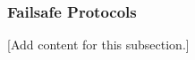 
\subsubsection{Failsafe Protocols}
\label{subsubsec:design_7_2_failsafe_protocols}

[Add content for this subsection.]
